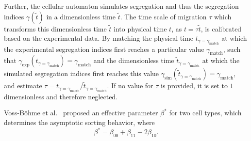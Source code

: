 \documentclass[10pt,letterpaper]{article}
\begin{document}
Further, the cellular automaton simulates segregation and thus the
segregation indices $\gamma(\tilde{t})$ in a dimensionless time
$\tilde{t}$. The time scale of migration $\tau$ which transforms this
dimensionless time $\tilde{t}$ into physical time $t$, as
$t = \tau\tilde{t}$, is calibrated based
on the experimental data. By matching the
physical time $t_{\gamma=\gamma_\text{match}}$ at which the
experimental segregation indices first reaches a particular value
$\gamma_\text{match}$, such that
$\gamma_\text{exp}(t_{\gamma=\gamma_\text{match}})=\gamma_\text{match}$
and the dimensionless time $\tilde{t}_{\gamma=\gamma_\text{match}}$ at
which the simulated segregation indices first reaches this value
$\gamma_\text{sim}(\tilde{t}_{\gamma=\gamma_\text{match}})=\gamma_\text{match}$,
and estimate
$\tau = t_{\gamma=\gamma_\text{match}} /
\tilde{t}_{\gamma=\gamma_\text{match}}$. If no value for $\tau$ is
provided, it is set to $1$ dimensionless and therefore neglected.

Voss-B\"ohme et al.~\cite{VosDeu2010} proposed an effective parameter $\beta^*$
for two cell types, which determines the asymptotic sorting behavior, where
%
\begin{equation}
  \beta^*=\beta_{00}+\beta_{11} - 2\beta_{10}\text{.}
\end{equation}
\end{document}
